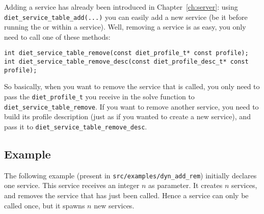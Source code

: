 Adding a service has already been introduced in
Chapter~\ref{ch:server}: using \verb|diet_service_table_add(...)| you
can easily add a new service (be it before running the \sed or within
a service). Well, removing a service is as easy, you only need to call
one of these methods: {\footnotesize
\begin{verbatim}
int diet_service_table_remove(const diet_profile_t* const profile);
int diet_service_table_remove_desc(const diet_profile_desc_t* const profile);
\end{verbatim}
}

So basically, when you want to remove the service that is called, you
only need to pass the \verb|diet_profile_t| you receive in the solve
function to \verb|diet_service_table_remove|. If you want to remove
another service, you need to build its profile description (just as if
you wanted to create a new service), and pass it to
\verb|diet_service_table_remove_desc|.


\subsection{Example}

The following example (present in \texttt{src/examples/dyn\_add\_rem})
initially declares one service. This service receives an integer $n$
as parameter. It creates $n$ services, and removes the service that
has just been called. Hence a service can only be called once, but it
spawns $n$ new services.

